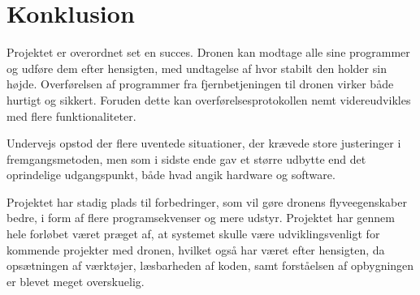 \documentclass[Main]{subfiles}
\begin{document}
\chapter{Konklusion}

Projektet er overordnet set en succes.
Dronen kan modtage alle sine programmer og udføre dem efter hensigten, med undtagelse af hvor stabilt den holder sin højde.
Overførelsen af programmer fra fjernbetjeningen til dronen virker både hurtigt og sikkert.
Foruden dette kan overførelsesprotokollen nemt videreudvikles med flere funktionaliteter.

Undervejs opstod der flere uventede situationer, der krævede store justeringer i fremgangsmetoden, men som i sidste ende gav et større udbytte end det oprindelige udgangspunkt, både hvad angik hardware og software.

Projektet har stadig plads til forbedringer, som vil gøre dronens flyveegenskaber bedre, i form af flere programsekvenser og mere udstyr.
Projektet har gennem hele forløbet været præget af, at systemet skulle være udviklingsvenligt for kommende projekter med dronen, hvilket også har været efter hensigten, da opsætningen af værktøjer, læsbarheden af koden, samt forståelsen af opbygningen er blevet meget overskuelig.
\end{document}
